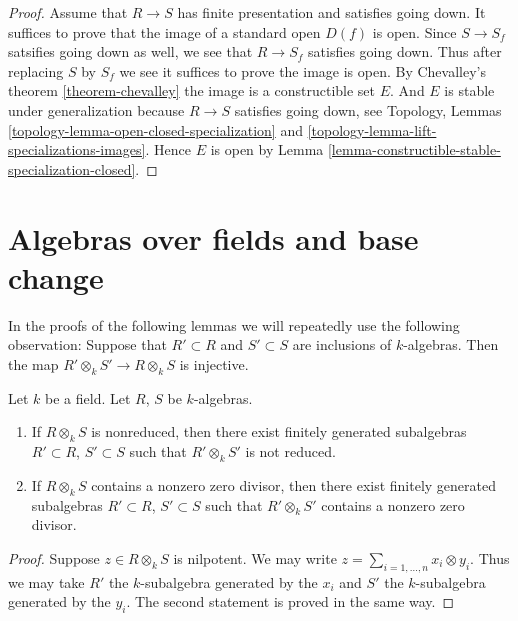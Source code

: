 \begin{proof}
Assume that $R \to S$ has finite presentation and satisfies
going down.
It suffices to prove that the image of a standard open $D(f)$ is open.
Since $S \to S_f$ satsifies going down as well, we see that
$R \to S_f$ satisfies going down. Thus after replacing
$S$ by $S_f$ we see it suffices to prove the image is
open. By Chevalley's theorem \ref{theorem-chevalley}
the image is a constructible set $E$. And $E$ is stable
under generalization because $R \to S$ satisfies going down,
see Topology, Lemmas \ref{topology-lemma-open-closed-specialization}
and \ref{topology-lemma-lift-specializations-images}.
Hence $E$ is open by
Lemma \ref{lemma-constructible-stable-specialization-closed}.
\end{proof}















\section{Algebras over fields and base change}
\label{section-algebras-over-fields}

\noindent
In the proofs of the following lemmas we will repeatedly use
the following observation: Suppose that $R' \subset R$ and
$S' \subset S$ are inclusions of $k$-algebras.
Then the map $R' \otimes_k S' \to R \otimes_k S$
is injective.

\begin{lemma}
\label{lemma-limit-argument}
Let $k$ be a field. Let $R$, $S$ be $k$-algebras.
\begin{enumerate}
\item If $R \otimes_k S$ is nonreduced, then there exist
finitely generated subalgebras $R' \subset R$,
$S' \subset S$ such that $R' \otimes_k S'$ is not reduced.
\item If $R \otimes_k S$ contains a nonzero zero divisor, then there exist
finitely generated subalgebras $R' \subset R$,
$S' \subset S$ such that $R' \otimes_k S'$ contains a nonzero zero divisor.
\end{enumerate}
\end{lemma}

\begin{proof}
Suppose $z \in R \otimes_k S$ is nilpotent. We may write
$z = \sum_{i = 1, \ldots, n} x_i \otimes y_i$.
Thus we may take $R'$ the $k$-subalgebra generated by
the $x_i$ and $S'$ the $k$-subalgebra generated by the $y_i$.
The second statement is proved in the same way.
\end{proof}

